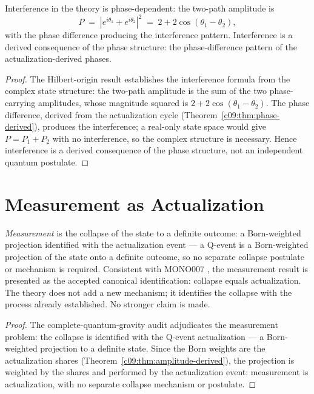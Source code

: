 \begin{theorem}
\label{c09:thm:interference}
Interference in the theory is phase-dependent: the two-path amplitude is
\begin{equation}
\label{c09:eq:interference}
P \;=\; \left|e^{i\theta_1} + e^{i\theta_2}\right|^2
\;=\; 2 + 2\cos(\theta_1 - \theta_2),
\end{equation}
with the phase difference producing the interference pattern. Interference is a derived
consequence of the phase structure: the phase-difference pattern of the
actualization-derived phases.
\end{theorem}

\begin{proof}
The Hilbert-origin result \cite{c09:QG218} establishes the interference formula from the
complex state structure: the two-path amplitude is the sum of the two phase-carrying
amplitudes, whose magnitude squared is $2 + 2\cos(\theta_1 - \theta_2)$. The phase
difference, derived from the actualization cycle (Theorem~\ref{c09:thm:phase-derived}),
produces the interference; a real-only state space would give $P = P_1 + P_2$ with no
interference, so the complex structure is necessary. Hence interference is a derived
consequence of the phase structure, not an independent quantum postulate.
\end{proof}

\section{Measurement as Actualization}
\label{c09:sec:measurement}

\begin{theorem}
\label{c09:thm:measurement-actualization}
\emph{Measurement} is the collapse of the state to a definite outcome: a Born-weighted
projection identified with the actualization event --- a Q-event is a Born-weighted
projection of the state onto a definite outcome, so no separate collapse postulate or
mechanism is required. Consistent with MONO007 \cite{c09:MONO007}, the measurement result
is presented as the accepted canonical identification: collapse equals actualization. The
theory does not add a new mechanism; it identifies the collapse with the process already
established. No stronger claim is made.
\end{theorem}

\begin{proof}
The complete-quantum-gravity audit \cite{c09:QG223} adjudicates the measurement problem: the
collapse is identified with the Q-event actualization --- a Born-weighted projection to a
definite state. Since the Born weights are the actualization shares
(Theorem~\ref{c09:thm:amplitude-derived}), the projection is weighted by the shares and
performed by the actualization event: measurement is actualization, with no separate
collapse mechanism or postulate.
\end{proof}

